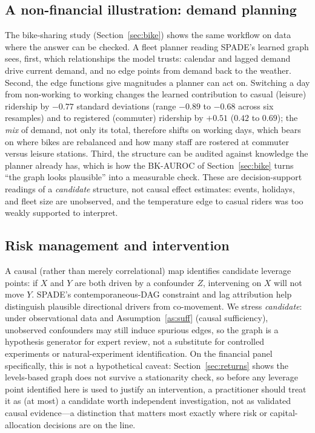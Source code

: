 \subsection{A non-financial illustration: demand planning}
\label{sec:demandplan}
The bike-sharing study (Section~\ref{sec:bike}) shows the same workflow on data
where the answer can be checked. A fleet planner reading SPADE's learned graph
sees, first, which relationships the model trusts: calendar and lagged demand
drive current demand, and no edge points from demand back to the weather.
Second, the edge functions give magnitudes a planner can act on. Switching a day
from non-working to working changes the learned contribution to casual (leisure)
ridership by $-0.77$ standard deviations (range $-0.89$ to $-0.68$ across six
resamples) and to registered (commuter) ridership by $+0.51$ ($0.42$ to $0.69$);
the \emph{mix} of demand, not only its total, therefore shifts on working days,
which bears on where bikes are rebalanced and how many staff are rostered at
commuter versus leisure stations. Third, the structure can be audited against
knowledge the planner already has, which is how the BK-AUROC of
Section~\ref{sec:bike} turns ``the graph looks plausible'' into a measurable
check. These are decision-support readings of a \emph{candidate} structure, not
causal effect estimates: events, holidays, and fleet size are unobserved, and the
temperature edge to casual riders was too weakly supported to interpret.

\subsection{Risk management and intervention}
A causal (rather than merely correlational) map identifies candidate leverage
points: if $X$ and $Y$ are both driven by a confounder $Z$, intervening on $X$
will not move $Y$. SPADE's contemporaneous-DAG constraint and lag attribution
help distinguish plausible directional drivers from co-movement. We stress
\emph{candidate}: under observational data and Assumption~\ref{as:suff} (causal
sufficiency), unobserved confounders may still induce spurious edges, so the
graph is a hypothesis generator for expert review, not a substitute for
controlled experiments or natural-experiment identification. On the financial
panel specifically, this is not a hypothetical caveat: Section~\ref{sec:returns}
shows the levels-based graph does not survive a stationarity check, so before
any leverage point identified here is used to justify an intervention, a
practitioner should treat it as (at most) a candidate worth independent
investigation, not as validated causal evidence---a distinction that matters
most exactly where risk or capital-allocation decisions are on the line.

